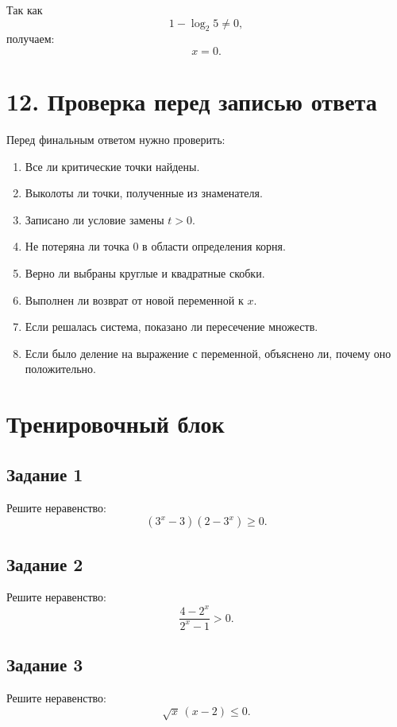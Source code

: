 \documentclass[a4paper,12pt]{article}
\begin{document}
Так как
\[
1-\log_2 5\ne0,
\]
получаем:
\[
x=0.
\]

\section*{12. Проверка перед записью ответа}

Перед финальным ответом нужно проверить:

\begin{enumerate}[label=\(\square\), leftmargin=8mm]
\item Все ли критические точки найдены.
\item Выколоты ли точки, полученные из знаменателя.
\item Записано ли условие замены \(t>0\).
\item Не потеряна ли точка \(0\) в области определения корня.
\item Верно ли выбраны круглые и квадратные скобки.
\item Выполнен ли возврат от новой переменной к \(x\).
\item Если решалась система, показано ли пересечение множеств.
\item Если было деление на выражение с переменной, объяснено ли, почему оно положительно.
\end{enumerate}

\newpage

\section*{Тренировочный блок}

\subsection*{Задание 1}

Решите неравенство:
\[
(3^x-3)(2-3^x)\ge0.
\]

\subsection*{Задание 2}

Решите неравенство:
\[
\frac{4-2^x}{2^x-1}>0.
\]

\subsection*{Задание 3}

Решите неравенство:
\[
\sqrt{x}\,(x-2)\le0.
\]
\end{document}
